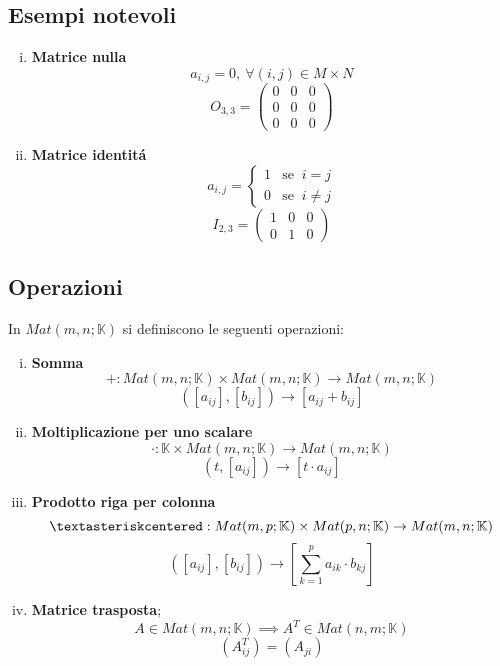 \documentclass{article}
\begin{document}
\subsection{Esempi notevoli}
\begin{enumerate}[i.]
	\item \textbf{Matrice nulla}
	      \[
		      a_{i,j} = 0, \  \forall (i,j) \in M \times N
	      \]
	      \[
		      O_{3,3} =
		      \begin{pmatrix}
			      0 & 0 & 0 \\
			      0 & 0 & 0 \\
			      0 & 0 & 0
		      \end{pmatrix}
	      \]
	\item \textbf{Matrice identitá}
	      \[
		      a_{i,j} =
		      \begin{cases}
			      1 & \text{se } \ i = j    \\
			      0 & \text{se } \ i \neq j
		      \end{cases}
	      \]
	      \[
		      I_{2,3} =
		      \begin{pmatrix}
			      1 & 0 & 0 \\
			      0 & 1 & 0
		      \end{pmatrix}
	      \]
\end{enumerate}
\subsection{Operazioni}
In $Mat(m , n ; \mathbb{K})$ si definiscono le seguenti operazioni:\\
\begin{enumerate}[i.]
	\item \textbf{Somma}
	      \[
		      +: Mat(m,n;\mathbb{K}) \times Mat(m,n;\mathbb{K}) \to Mat(m,n;\mathbb{K})
	      \]
	      \[
		      ([a_{ij}], [b_{ij}]) \to [a_{ij} +b_{ij}]
	      \]
	\item \textbf{Moltiplicazione per uno scalare}
	      \[
		      \cdot : \mathbb{K} \times Mat(m,n;\mathbb{K}) \to Mat(m,n;\mathbb{K})
	      \]
	      \[
		      (t, [a_{ij}]) \to [t \cdot a_{ij}]
	      \]
	\item \textbf{Prodotto riga per colonna}
	      \[
		      \textasteriskcentered : Mat(m, p  ; \mathbb{K}) \times Mat(p, n ; \mathbb{K}) \to Mat(m, n ; \mathbb{K})
	      \]
	      \[
		      ([a_{ij}] , [b_{ij}]) \to [\sum_{k=1}^{p}a_{ik}\cdot b_{kj}]
	      \]
	\item \textbf{Matrice trasposta};
	      \[
		      A \in Mat(m,n;\mathbb{K}) \implies A^T \in Mat(n,m;\mathbb{K})
	      \]
	      \[
		      (A^T_{ij}) = (A_{ji})
	      \]
\end{enumerate}
\end{document}
